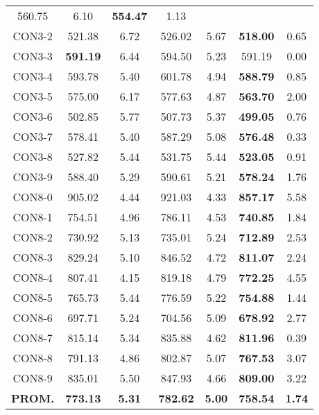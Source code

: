 \begin{table}[ht]
\begin{tabular}{c c c c c c c}
560.75 & 6.10 & \bf{554.47} & 
1.13\\CON3-2 & 521.38 & 6.72 & 
526.02 & 5.67 & \bf{518.00} & 
0.65\\CON3-3 & \bf{591.19} & 6.44 & 
594.50 & 5.23 & 591.19 & 0.00\\
CON3-4 & 593.78 & 5.40 & 
601.78 & 4.94 & \bf{588.79} & 
0.85\\CON3-5 & 575.00 & 6.17 & 
577.63 & 4.87 & \bf{563.70} & 
2.00\\CON3-6 & 502.85 & 5.77 & 
507.73 & 5.37 & \bf{499.05} & 
0.76\\CON3-7 & 578.41 & 5.40 & 
587.29 & 5.08 & \bf{576.48} & 
0.33\\CON3-8 & 527.82 & 5.44 & 
531.75 & 5.44 & \bf{523.05} & 
0.91\\CON3-9 & 588.40 & 5.29 & 
590.61 & 5.21 & \bf{578.24} & 
1.76\\CON8-0 & 905.02 & 4.44 & 
921.03 & 4.33 & \bf{857.17} & 
5.58\\CON8-1 & 754.51 & 4.96 & 
786.11 & 4.53 & \bf{740.85} & 
1.84\\CON8-2 & 730.92 & 5.13 & 
735.01 & 5.24 & \bf{712.89} & 
2.53\\CON8-3 & 829.24 & 5.10 & 
846.52 & 4.72 & \bf{811.07} & 
2.24\\CON8-4 & 807.41 & 4.15 & 
819.18 & 4.79 & \bf{772.25} & 
4.55\\CON8-5 & 765.73 & 5.44 & 
776.59 & 5.22 & \bf{754.88} & 
1.44\\CON8-6 & 697.71 & 5.24 & 
704.56 & 5.09 & \bf{678.92} & 
2.77\\CON8-7 & 815.14 & 5.34 & 
835.88 & 4.62 & \bf{811.96} & 
0.39\\CON8-8 & 791.13 & 4.86 & 
802.87 & 5.07 & \bf{767.53} & 
3.07\\CON8-9 & 835.01 & 5.50 & 
847.93 & 4.66 & \bf{809.00} & 
3.22\\\bf{PROM.} & 
\bf{773.13} & \bf{5.31} & \bf{782.62} & \bf{5.00} & \bf{758.54} & \bf{1.74}\\[1ex]\hline
\end{tabular}
\label{table:nonlin}
\end{table} \clearpage
